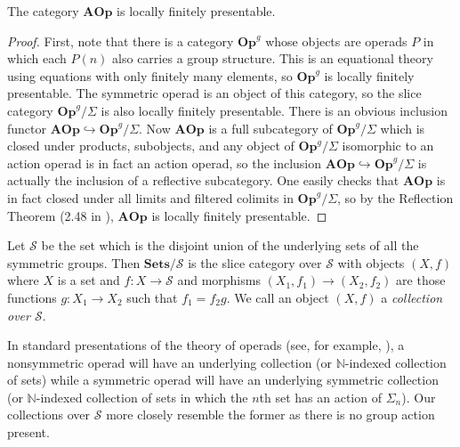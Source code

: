 \documentclass{amsbook} %
\newcommand{\mb}{\mathbf}
\renewcommand{\SS}{\mathcal{S}}
\numberwithin{section}{chapter}
\begin{document}
\begin{thm}
The category $\mb{AOp}$ is locally finitely presentable.
\end{thm}
\begin{proof}
First, note that there is a category $\mb{Op}^{g}$ whose objects are operads $P$ in which each $P(n)$ also carries a group structure.  This is an equational theory using equations with only finitely many elements, so $\mb{Op}^{g}$ is locally finitely presentable.  The symmetric operad is an object of this category, so the slice category $\mb{Op}^{g}/\Sigma$ is also locally finitely presentable.  There is an obvious inclusion functor $\mb{AOp} \hookrightarrow \mb{Op}^{g}/\Sigma$.  Now $\mb{AOp}$ is a full subcategory of $\mb{Op}^{g}/\Sigma$ which is closed under products, subobjects, and any object of $\mb{Op}^{g}/\Sigma$ isomorphic to an action operad is in fact an action operad, so the inclusion   $\mb{AOp} \hookrightarrow \mb{Op}^{g}/\Sigma$ is actually the inclusion of a reflective subcategory.  One easily checks that $\mb{AOp}$ is in fact closed under all limits and filtered colimits in $\mb{Op}^{g}/\Sigma$, so by the Reflection Theorem (2.48 in \cite{ar}), $\mb{AOp}$ is locally finitely presentable. 
\end{proof}

\begin{Defi}
Let $\SS$ be the set which is the disjoint union of the underlying sets of all the symmetric groups.  Then $\mb{Sets}/\SS$ is the slice category over $\SS$ with objects $(X,f)$ where $X$ is a set and $f:X \rightarrow \SS$ and morphisms $(X_{1}, f_{1}) \rightarrow (X_{2}, f_{2})$ are those functions $g:X_{1} \rightarrow X_{2}$ such that $f_{1} = f_{2}g$.  We call an object $(X,f)$ a \textit{collection over $\SS$}.
\end{Defi}

\begin{rem}
In standard presentations of the theory of operads (see, for example, \cite{mss-op}), a nonsymmetric operad will have an underlying collection (or $\mathbb{N}$-indexed collection of sets) while a symmetric operad will have an underlying symmetric collection (or $\mathbb{N}$-indexed collection of sets in which the $n$th set has an action of $\Sigma_{n}$).  Our collections over $\SS$ more closely resemble the former as there is no group action present.
\end{rem}
\end{document}
